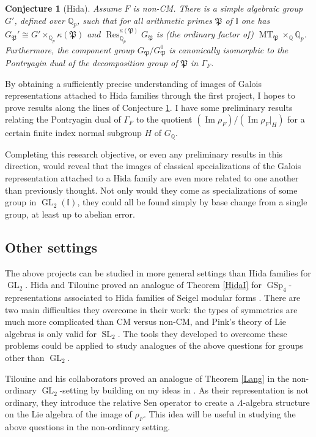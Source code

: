 \documentclass[11pt]{amsart}
\newtheorem{conj}{Conjecture}
\theoremstyle{definition}
\theoremstyle{remark}
\DeclareMathOperator{\MT}{MT}
\DeclareMathOperator{\Res}{Res}
\def\I{\mathbb{I}}
\def\Pp{\mathfrak{P}}
\def\Q{\mathbb{Q}}
\DeclareMathOperator{\GL}{GL}
\DeclareMathOperator{\GSp}{GSp}
\DeclareMathOperator{\im}{Im}
\DeclareMathOperator{\SL}{SL}
\begin{document}
\begin{conj}[Hida]\label{p-adic MT}
Assume $F$ is non-CM.  There is a simple algebraic group $G'$, defined over $\Q_p$, such that for all arithmetic primes $\Pp$ of $\I$ one has $G_\Pp' \cong G' \times_{\Q_p} \kappa(\Pp)$ and $\Res_{\Q_p}^{\kappa(\Pp)} G_\Pp$ is (the ordinary factor of) $\MT_\Pp \times_\Q \Q_p$.  Furthermore, the component group $G_\Pp/G_\Pp^0$ is canonically isomorphic to the Pontryagin dual of the decomposition group of $\Pp$ in $\Gamma_F$.
\end{conj} 

By obtaining a sufficiently precise understanding of images of Galois representations attached to Hida families through the first project, I hopes to prove results along the lines of Conjecture \ref{p-adic MT}.  I have some preliminary results relating the Pontryagin dual of $\Gamma_F$ to the quotient $(\im \rho_F)/(\im \rho_F|_H)$ for a certain finite index normal subgroup $H$ of $G_\Q$.

Completing this research objective, or even any preliminary results in this direction, would reveal that the images of classical specializations of the Galois representation attached to a Hida family are even more related to one another than previously thought.  Not only would they come as specializations of some group in $\GL_2(\I)$, they could all be found simply by base change from a single group, at least up to abelian error.

\subsection*{Other settings}
The above projects can be studied in more general settings than Hida families for $\GL_2$.  Hida and Tilouine proved an analogue of Theorem \ref{HidaI} for $\GSp_4$-representations associated to Hida families of Seigel modular forms \cite{HidaTilouine15}.  There are two main difficulties they overcome in their work: the types of symmetries are much more complicated than CM versus non-CM, and Pink's theory of Lie algebras is only valid for $\SL_2$.  The tools they developed to overcome these problems could be applied to study analogues of the above questions for groups other than $\GL_2$.  

Tilouine and his collaborators proved an analogue of Theorem \ref{Lang} in the non-ordinary $\GL_2$-setting \cite{CIT15} by building on my ideas in \cite{Lang15}.  As their representation is not ordinary, they introduce the relative Sen operator to create a $\Lambda$-algebra structure on the Lie algebra of the image of $\rho_F$.  This idea will be useful in studying the above questions in the non-ordinary setting. 

\normalsize{}{}

\end{document}
